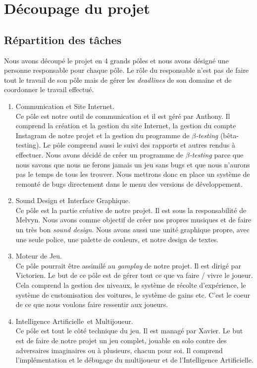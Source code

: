 \documentclass[11pt,a4paper]{article}
\newcommand{\AI}{Intelligence Artificielle}
\begin{document}
\section{Découpage du projet}
  \subsection{Répartition des tâches} 
    Nous avons découpé le projet en 4 grands pôles et nous avons désigné une personne responsable
    pour chaque pôle. Le rôle du responsable n'est pas de faire tout le travail de son pôle mais
    de gérer les \textit{deadlines} de son domaine et de coordonner le travail effectué.
    \begin{enumerate}
      \item Communication et Site Internet.\\
        Ce pôle est notre outil de communication et il est géré par Anthony. Il comprend la création
        et la gestion du site Internet, la gestion du compte Instagram de notre projet \cite{insta} et la
        gestion du programme de \(\beta\)\textit{-testing} (bêta-testing). Le pôle comprend aussi le suivi
        des rapports et autres rendus à effectuer. Nous avons décidé de 
        créer un programme de \(\beta\)\textit{-testing} parce que nous savons que nous ne ferons
        jamais un jeu sans bugs et que nous n'aurons pas le temps de tous les trouver. Nous mettrons
        donc en place un système de remonté de bugs directement dans le menu des versions de développement.
      \item Sound Design et Interface Graphique.\\
        Ce pôle est la partie créative de notre projet. Il est sous la responsabilité de Melvyn.
        Nous avons comme objectif de créer nos propres musiques et de faire un très bon \textit{sound design}.
        Nous avons aussi une unité graphique propre, avec une seule police, une palette de couleurs, et notre
        design de textes.
      \item Moteur de Jeu.\\
        Ce pôle pourrait être assimilé au \textit{gamplay} de notre projet. Il est dirigé par Victorien.
        Le but de ce pôle est de gérer tout ce que va faire / vivre le joueur. Cela comprend la gestion des niveaux,
        le système de récolte d'expérience, le système de customisation des voitures, le système de gains etc. C'est le coeur de ce que nous voulons faire ressentir aux joueurs.
      \item \AI\, et Multijoueur.\\
        Ce pôle est tout le côté technique du jeu. Il est managé par Xavier. Le but est de faire de notre projet
        un jeu complet, jouable en solo contre des adversaires imaginaires ou à plusieurs, chacun pour soi. Il comprend l'implémentation et le débugage du multijoueur et de l'\AI.
    \end{enumerate}
  \clearpage
\end{document}
